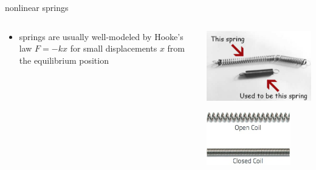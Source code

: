 \documentclass[urlcolor=blue,dvipsnames]{beamer}
\begin{document}
\begin{frame}{nonlinear springs}

\begin{columns}
\begin{column}{0.65\textwidth}
\begin{itemize}
\item springs are usually well-modeled by Hooke's law $F=-kx$ for small displacements $x$ from the equilibrium position
\end{itemize}
\end{column}
\begin{column}{0.35\textwidth}
\includegraphics[width=\textwidth]{figs/spring-failure}

\vspace{10mm}

\includegraphics[width=0.8\textwidth]{figs/open-closed-spring}
\end{column}
\end{columns}


\end{frame}
\end{document}
